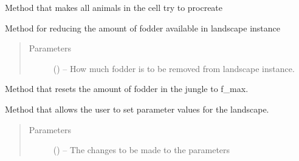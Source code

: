 \documentclass[a4paper,10pt,english]{sphinxmanual}
\begin{document}
\begin{fulllineitems}
\begin{fulllineitems}
\end{fulllineitems}


\begin{fulllineitems}
\label{\detokenize{landscape:biosim.landscape.Jungle.procreation}}
Method that makes all animals in the cell try to procreate

\end{fulllineitems}


\begin{fulllineitems}
\label{\detokenize{landscape:biosim.landscape.Jungle.reduce_fodder}}
Method for reducing the amount of fodder available in landscape instance
\begin{quote}\begin{description}
\item[{Parameters}] \leavevmode
{} (\sphinxstyleliteralemphasis{, }) -- How much fodder is to be removed from landscape instance.

\end{description}\end{quote}

\end{fulllineitems}


\begin{fulllineitems}
\label{\detokenize{landscape:biosim.landscape.Jungle.reset_fodder}}
Method that resets the amount of fodder in the jungle to f\_max.

\end{fulllineitems}


\begin{fulllineitems}
\label{\detokenize{landscape:biosim.landscape.Jungle.set_parameters}}
Method that allows the user to set parameter values for the landscape.
\begin{quote}\begin{description}
\item[{Parameters}] \leavevmode
{} () -- The changes to be made to the parameters

\end{description}\end{quote}

\end{fulllineitems}


\end{fulllineitems}
\end{document}
